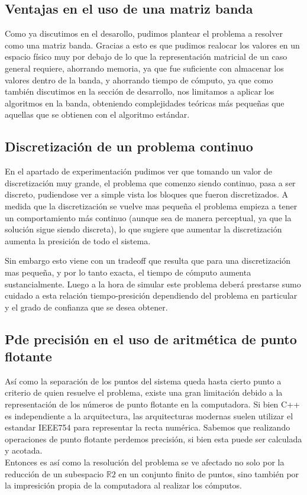 \subsection{Ventajas en el uso de una matriz banda}

Como ya discutimos en el desarollo, pudimos plantear el problema a resolver como una matriz banda. Gracias a esto es que pudimos realocar los valores en un espacio físico muy por debajo de lo que la representación matricial de un caso general requiere, ahorrando memoria, ya que fue suficiente con almacenar los valores dentro de la banda, y ahorrando tiempo de cómputo, ya que como también discutimos en la sección de desarrollo, nos limitamos a aplicar los algoritmos en la banda, obteniendo complejidades teóricas más pequeñas que aquellas que se obtienen con el algoritmo estándar.

\subsection{Discretización de un problema continuo}

En el apartado de experimentación pudimos ver que tomando un valor de discretización muy grande, el problema que comenzo siendo continuo, pasa a ser discreto, pudiendose ver a simple vista los bloques que fueron discretizados. A medida que la discretización se vuelve mas pequeña el problema empieza a tener un comportamiento más continuo (aunque sea de manera perceptual, ya que la solución sigue siendo discreta), lo que sugiere que aumentar la discretización aumenta la presición de todo el sistema.

Sin embargo esto viene con un tradeoff que resulta que para una discretización mas pequeña, y por lo tanto exacta, el tiempo de cómputo aumenta sustancialmente. Luego a la hora de simular este problema deberá prestarse sumo cuidado a esta relación tiempo-presición dependiendo del problema en particular y el grado de confianza que se desea obtener.

\subsection{P de precisión en el uso de aritmética de punto flotante}

Así como la separación de los puntos del sistema queda hasta cierto punto a criterio de quien resuelve el problema, existe una gran limitación debido	a la representación de los números de punto flotante en la computadora. Si bien C++ es independiente a la arquitectura, las arquitecturas modernas suelen utilizar el estandar IEEE754 para representar la recta numérica. Sabemos que realizando operaciones de punto flotante perdemos precisión, si bien esta puede ser calculada y acotada. 
\\
Entonces es así como la resolución del problema se ve afectado no solo por la reducción de un subespacio $\mathbb{R}2$ en un conjunto finito de puntos, sino también por la impresición propia de la computadora al realizar los cómputos.

